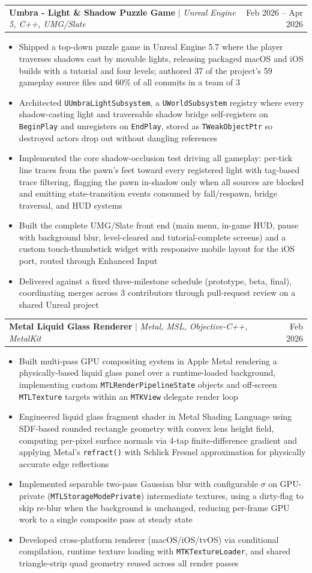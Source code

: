 \documentclass[letterpaper,11pt]{article}
\makeatletter
\newcommand{\resumeItem}[1]{
  \item\small{
    {#1 \vspace{-3pt}}
  }
}
\newcommand{\resumeProjectHeading}[2]{
    \item
    \begin{tabular*}{0.97\textwidth}{l@{\extracolsep{\fill}}r}
      \small#1 & #2 \\
    \end{tabular*}\vspace{-7pt}
}
\newcommand{\resumeItemListStart}{\begin{itemize}}
\newcommand{\resumeItemListEnd}{\end{itemize}\vspace{-5pt}}
\makeatother
\begin{document}
    \resumeProjectHeading
          {\textbf{Umbra - Light \& Shadow Puzzle Game} $|$ \emph{Unreal Engine 5, C++, UMG/Slate}}{Feb 2026 -- Apr 2026}
          \resumeItemListStart
          \resumeItem{Shipped a top-down puzzle game in Unreal Engine 5.7 where the player traverses shadows cast by movable lights, releasing packaged macOS and iOS builds with a tutorial and four levels; authored 37 of the project's 59 gameplay source files and 60\% of all commits in a team of 3}
          \resumeItem{Architected \texttt{UUmbraLightSubsystem}, a \texttt{UWorldSubsystem} registry where every shadow-casting light and traversable shadow bridge self-registers on \texttt{BeginPlay} and unregisters on \texttt{EndPlay}, stored as \texttt{TWeakObjectPtr} so destroyed actors drop out without dangling references}
          \resumeItem{Implemented the core shadow-occlusion test driving all gameplay: per-tick line traces from the pawn's feet toward every registered light with tag-based trace filtering, flagging the pawn in-shadow only when all sources are blocked and emitting state-transition events consumed by fall/respawn, bridge traversal, and HUD systems}
          \resumeItem{Built the complete UMG/Slate front end (main menu, in-game HUD, pause with background blur, level-cleared and tutorial-complete screens) and a custom touch-thumbstick widget with responsive mobile layout for the iOS port, routed through Enhanced Input}
          \resumeItem{Delivered against a fixed three-milestone schedule (prototype, beta, final), coordinating merges across 3 contributors through pull-request review on a shared Unreal project}
          \resumeItemListEnd

    \resumeProjectHeading
          {\textbf{Metal Liquid Glass Renderer} $|$ \emph{Metal, MSL, Objective-C++, MetalKit}}{Feb 2026}
          \resumeItemListStart
          \resumeItem{Built multi-pass GPU compositing system in Apple Metal rendering a physically-based liquid glass panel over a runtime-loaded background, implementing custom \texttt{MTLRenderPipelineState} objects and off-screen \texttt{MTLTexture} targets within an \texttt{MTKView} delegate render loop}
          \resumeItem{Engineered liquid glass fragment shader in Metal Shading Language using SDF-based rounded rectangle geometry with convex lens height field, computing per-pixel surface normals via 4-tap finite-difference gradient and applying Metal's \texttt{refract()} with Schlick Fresnel approximation for physically accurate edge reflections}
          \resumeItem{Implemented separable two-pass Gaussian blur with configurable $\sigma$ on GPU-private (\texttt{MTLStorageModePrivate}) intermediate textures, using a dirty-flag to skip re-blur when the background is unchanged, reducing per-frame GPU work to a single composite pass at steady state}
          \resumeItem{Developed cross-platform renderer (macOS/iOS/tvOS) via conditional compilation, runtime texture loading with \texttt{MTKTextureLoader}, and shared triangle-strip quad geometry reused across all render passes}
          \resumeItemListEnd
\end{document}
